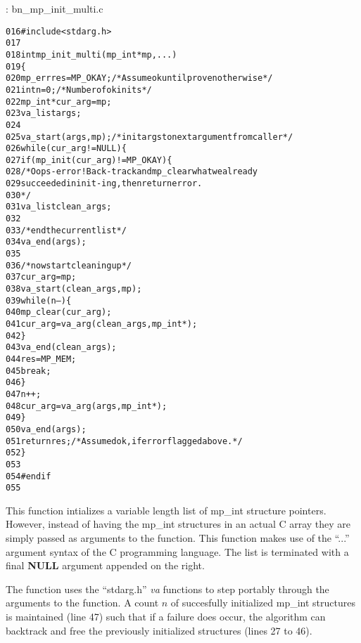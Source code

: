\documentclass[b5paper]{book}
\begin{document}
\vspace{+3mm}\begin{small}
\hspace{-5.1mm}{\bf File}: bn\_mp\_init\_multi.c
\vspace{-3mm}
\begin{alltt}
016   #include <stdarg.h>
017   
018   int mp_init_multi(mp_int *mp, ...) 
019   \{
020       mp_err res = MP_OKAY;      /* Assume ok until proven otherwise */
021       int n = 0;                 /* Number of ok inits */
022       mp_int* cur_arg = mp;
023       va_list args;
024   
025       va_start(args, mp);        /* init args to next argument from caller */
026       while (cur_arg != NULL) \{
027           if (mp_init(cur_arg) != MP_OKAY) \{
028               /* Oops - error! Back-track and mp_clear what we already
029                  succeeded in init-ing, then return error.
030               */
031               va_list clean_args;
032               
033               /* end the current list */
034               va_end(args);
035               
036               /* now start cleaning up */            
037               cur_arg = mp;
038               va_start(clean_args, mp);
039               while (n--) \{
040                   mp_clear(cur_arg);
041                   cur_arg = va_arg(clean_args, mp_int*);
042               \}
043               va_end(clean_args);
044               res = MP_MEM;
045               break;
046           \}
047           n++;
048           cur_arg = va_arg(args, mp_int*);
049       \}
050       va_end(args);
051       return res;                /* Assumed ok, if error flagged above. */
052   \}
053   
054   #endif
055   
\end{alltt}
\end{small}

This function intializes a variable length list of mp\_int structure pointers.  However, instead of having the mp\_int
structures in an actual C array they are simply passed as arguments to the function.  This function makes use of the 
``...'' argument syntax of the C programming language.  The list is terminated with a final \textbf{NULL} argument 
appended on the right.  

The function uses the ``stdarg.h'' \textit{va} functions to step portably through the arguments to the function.  A count
$n$ of succesfully initialized mp\_int structures is maintained (line 47) such that if a failure does occur,
the algorithm can backtrack and free the previously initialized structures (lines 27 to 46).  
\end{document}
